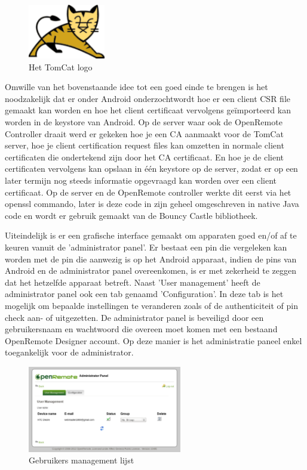 \documentclass[]{article}
\begin{document}
\begin{figure}
  \begin{center}
    \includegraphics[width=0.30\textwidth]{tomcat.pdf}
  \end{center}
  \caption{Het TomCat logo}
\end{figure}

Omwille van het bovenstaande idee tot een goed einde te brengen is het noodzakelijk dat er onder Android
onderzochtwordt hoe er een client CSR file gemaakt kan worden en hoe het client
certificaat vervolgens geïmporteerd kan worden in de keystore van Android. Op de
server waar ook de OpenRemote Controller draait werd er gekeken hoe je een
CA aanmaakt voor de TomCat server, hoe je client certification request
files kan omzetten in normale client certificaten die ondertekend zijn door
het CA certificaat. En hoe je de client certificaten vervolgens kan opslaan
in één keystore op de server, zodat er op een later termijn nog steeds
informatie opgevraagd kan worden over een client certificaat. Op de server
en de OpenRemote controller werkte dit eerst via het openssl
commando, later is deze code in zijn geheel omgeschreven in native Java
code en wordt er gebruik gemaakt van de Bouncy Castle bibliotheek.

Uiteindelijk is er een grafische interface gemaakt om apparaten goed en/of
af te keuren vanuit de 'administrator panel'. Er bestaat een pin die
vergeleken kan worden met de pin die aanwezig is op het Android apparaat,
indien de pins van Android en de administrator panel overeenkomen, is er
met zekerheid te zeggen dat het hetzelfde apparaat betreft. Naast 'User
management' heeft de administrator panel ook een tab genaamd
'Configuration'. In deze tab is het mogelijk om bepaalde instellingen te
veranderen zoals of de authenticiteit of pin check aan- of uitgezetten. 
De administrator panel is beveiligd door een gebruikersnaam en wachtwoord 
die overeen moet komen met een bestaand OpenRemote Designer account.
Op deze manier is het administratie paneel enkel toegankelijk voor de administrator.

\begin{figure}[htpb]
   \begin{center}
     \includegraphics[width=0.6\textwidth]{userlist.pdf}
   \end{center}
   \caption{Gebruikers management lijst}
\end{figure}
\end{document}
